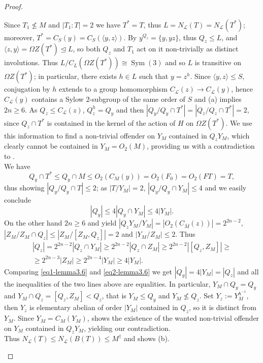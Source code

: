 \documentclass{amsart}
\numberwithin{equation}{section}
\theoremstyle{definition}
\theoremstyle{subresult}
\theoremstyle{caseresult}
\renewcommand{\L}{\mathcal{L}}
\newcommand{\Sym}{\operatorname{Sym}}
\newcommand{\ov}{\overline}
\newcommand{\norm}{\trianglelefteq}
\newcommand{\inv}{^{-1}}
\newcommand{\fto}{\longrightarrow}
\newcommand{\<}{\langle}
\renewcommand{\>}{\rangle}
\begin{document}
\begin{proof}
\begin{itemize}
        Since $T_1 \not \le M$ and $|T_1:T|=2$ we have $T^* = T$, thus $L=N_\L(T)=N_\L(T^*)$; moreover, $T^* = C_S(y) = C_S(\<y,z\>)$. By \cite[Lemma3.4(a) and (f)]{Meier-Stell-Stroth:2012} $y^{Q_z} = \{y,yz\}$, thus $Q_z \le L$, and $\<z,y\> = \Omega Z(T^*) \norm L$, so both $Q_z$ and $T_1$ act on it non-trivially as distinct involutions. Thus $L/C_L(\Omega Z(T^*)) \cong \Sym(3)$ and so $L$ is transitive on $\Omega Z(T^*)$; in particular, there exists $h \in L$ such that $y=z^h$. Since $\<y,z\> \le S$, conjugation by $h$ extends to a group homomorphism $C_\L(z) \fto C_\L(y)$, hence $C_\L(y)$ contains a Sylow $2$-subgroup of the same order of $S$ and (a) implies $2n \ge 6$. As $Q_z \le C_\L(z)$, $Q_z^h =Q_y$ and then $|Q_y/Q_y \cap T^*|=|Q_z/Q_z \cap T^*| = 2$, since $Q_z \cap T^*$ is contained in the kernel of the action of $H$ on $\Omega Z(T^*)$. We use this information to find a non-trivial offender on $Y_M$ contained in $Q_zY_M$, which clearly cannot be contained in $Y_M=O_2(M)$, providing us with a contradiction to \cite[Lemma 3.4(j)]{Meier-Stell-Stroth:2012}.\\
		We have
		\[
		Q_y \cap T^* \le Q_y \cap M \le O_2(C_M(y)) = O_2(F_0) = O_2(FT) = T,
		\]
		thus showing $|Q_y/Q_y \cap T| \le 2$; as $|T/Y_M|=2$, $|Q_y / Q_y \cap Y_M| \le 4$ and we easily conclude 
		\begin{equation*}
			\label{eq1-lemma3.6}
			\tag{*}
			|Q_y| \le 4|Q_y \cap Y_M| \le 4|Y_M|.
		\end{equation*}
		On the other hand $2n \ge 6$ and \cite[Lemma 3.3(c) and (f)]{Meier-Stell-Stroth:2012} yield $|Q_zY_M/Y_M| = |O_2(C_{\ov{M}}(z))| = 2^{2n-2}$, $|Z_M/Z_M \cap Q_z| \le |Z_M/[Z_M,Q_z]| = 2$ and $|Y_M/Z_M| \le 2$. Thus
		\begin{multline*}
			\label{eq2-lemma3.6}
			\tag{**}
			|Q_z| = 2^{2n-2}|Q_z \cap Y_M| \ge 2^{2n-2}|Q_z \cap Z_M| \ge 2^{2n-2}|[Q_z, Z_M]| \ge \\
			\ge 2^{2n-3}|Z_M| \ge 2^{2n-4}|Y_M| \ge 4|Y_M|.
		\end{multline*}
		Comparing \eqref{eq1-lemma3.6} and \eqref{eq2-lemma3.6} we get $|Q_y| = 4|Y_M| = |Q_z|$ and all the inequalities of the two lines above are equalities. In particular, $Y_M \cap Q_y = Q_y$ and $Y_M \cap Q_z = [Q_z,Z_M] < Q_z$, that is $Y_M \le Q_y$ and $Y_M \not \le Q_z$. Set $Y_z := Y_M^{h\inv}$, then $Y_z$ is elementary abelian of order $|Y_M|$ contained in $Q_z$, so it is distinct from $Y_M$. Since $Y_M=C_M(Y_M)$, \cite[Lemma A.40]{Meier-Stell-Stroth:2012} shows the existence of the wanted non-trivial offender on $Y_M$ contained in $Q_zY_M$, yielding our contradiction.\\
		
		Thus $N_\L(T) \le N_\L(B(T)) \le M^\dagger$ and \cite[Lemma 3.4(e)]{Meier-Stell-Stroth:2012} shows (b).
	\end{itemize}
\end{proof}
\end{document}
